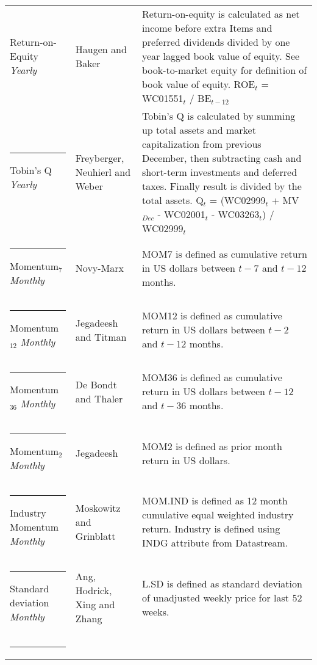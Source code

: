 \documentclass{article}
\begin{document}
{{\begin{xltabular}{\textwidth}{ >{\raggedright\arraybackslash}p{0.23\textwidth} >{\raggedright\arraybackslash}p{0.2\textwidth} X}
Return-on-Equity \newline \emph{Yearly}		& Haugen and Baker \citeyear{HAUGEN1996}		& Return-on-equity is calculated as net income before extra Items and preferred dividends divided by one year lagged book value of equity. See book-to-market equity for definition of book value of equity. \newline ROE$_t$ = WC01551$_{t}$ / BE$_{t-12}$ \\ \rule{-1ex}{3ex}
Tobin's Q 	\newline \emph{Yearly}			& Freyberger, Neuhierl and Weber \citeyear{Freyberger2020} & Tobin's Q is calculated by summing up total assets and market capitalization from previous December, then subtracting cash and short-term investments and deferred taxes. Finally result is divided by the total assets. \newline Q$_t$ = (WC02999$_{t}$ + MV$_{Dec}$ - WC02001$_{t}$ - WC03263$_{t}$) / WC02999$_{t}$ \\ \rule{-1ex}{3ex}
Momentum$_{7}$ \newline \emph{Monthly}	& Novy-Marx \citeyear{NOVYMARX2012}			& MOM7 is defined as cumulative return in US dollars between $t-7$ and $t-12$ months.\\ \rule{-1ex}{3ex}
Momentum$_{12}$ \newline \emph{Monthly}	& Jegadeesh and Titman \citeyear{Jegadeesh1993}	& MOM12 is defined as cumulative return in US dollars between $t-2$ and $t-12$ months.\\ \rule{-1ex}{3ex}
Momentum$_{36}$ \newline \emph{Monthly}	& De Bondt and Thaler \citeyear{DeBondt1985}		& MOM36 is defined as cumulative return in US dollars between $t-12$ and $t-36$ months.\\ \rule{-1ex}{3ex}
Momentum$_{2}$ \newline \emph{Monthly}	& Jegadeesh \citeyear{Jegadeesh1990}			& MOM2 is defined as prior month return in US dollars.\\ \rule{-1ex}{3ex}
Industry Momentum \newline \emph{Monthly} 	& Moskowitz and Grinblatt \citeyear{Moskowitz1999}	& MOM.IND is defined as 12 month cumulative equal weighted industry return. Industry is defined using INDG attribute from Datastream. \\ \rule{-1ex}{3ex}
Standard deviation \newline \emph{Monthly}	& Ang, Hodrick, Xing and Zhang \citeyear{ang2006}	& L.SD is defined as standard deviation of unadjusted weekly price for last 52 weeks. \\ \rule{-1ex}{3ex}

\end{xltabular}}}
\end{document}
